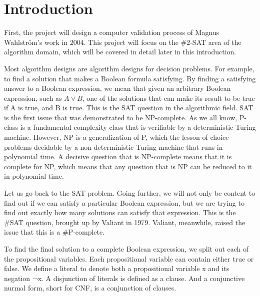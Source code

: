 \documentclass{sigchi}
\def\plainkeywords{\#SAT; \#2SAT; graph theory; complexity theory}
\begin{document}
\keywords{\plainkeywords}

\section{Introduction}
First, the project will design a computer validation process of Magnus Wahlström's work in 2004.\cite{10.1016/j.tcs.2004.10.037} This project will focus on the \#2-SAT area of the algorithm domain, which will be covered in detail later in this introduction.

Most algorithm designs are algorithm designs for decision problems. For example, to find a solution that makes a Boolean formula satisfying. By finding a satisfying answer to a Boolean expression, we mean that given an arbitrary Boolean expression, such as $A \vee B $, one of the solutions that can make its result to be true if A is true, and B is true. This is the SAT question in the algorithmic field. SAT is the first issue that was demonstrated to be NP-complete.\cite{10.1145/800157.805047} As we all know, P-class is a fundamental complexity class that is verifiable by a deterministic Turing machine. However, NP is a generalization of P, which the lesson of choice problems decidable by a non-deterministic Turing machine that runs in polynomial time. A decisive question that is NP-complete means that it is complete for NP, which means that any question that is NP can be reduced to it in polynomial time.

Let us go back to the SAT problem. Going further, we will not only be content to find out if we can satisfy a particular Boolean expression, but we are trying to find out exactly how many solutions can satisfy that expression. This is the \#SAT question, brought up by Valiant in 1979.\cite{10.1016/0304-3975(79)90044-6} Valiant, meanwhile, raised the issue that this is a \#P-complete.

To find the final solution to a complete Boolean expression, we split out each of the propositional variables. Each propositional variable can contain either true or false. We define a literal to denote both a propositional variable x and its negation ¬x. A disjunction of literals is defined as a clause. And a conjunctive nurmal form, short for CNF, is a conjunction of clauses.
\end{document}
